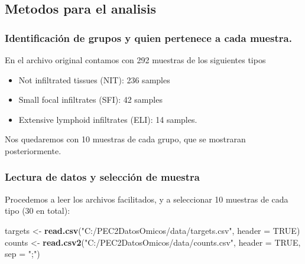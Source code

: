 \documentclass[
]{article}
\newenvironment{Shaded}{\begin{snugshade}}{\end{snugshade}}
\newcommand{\DataTypeTok}[1]{\textcolor[rgb]{0.13,0.29,0.53}{#1}}
\newcommand{\KeywordTok}[1]{\textcolor[rgb]{0.13,0.29,0.53}{\textbf{#1}}}
\newcommand{\NormalTok}[1]{#1}
\newcommand{\OtherTok}[1]{\textcolor[rgb]{0.56,0.35,0.01}{#1}}
\newcommand{\StringTok}[1]{\textcolor[rgb]{0.31,0.60,0.02}{#1}}
\providecommand{\tightlist}{%
  \setlength{\itemsep}{0pt}\setlength{\parskip}{0pt}}
\begin{document}
\hypertarget{metodos-para-el-analisis}{%
\subsection{Metodos para el analisis}\label{metodos-para-el-analisis}}

\hypertarget{identificaciuxf3n-de-grupos-y-quien-pertenece-a-cada-muestra.}{%
\subsubsection{Identificación de grupos y quien pertenece a cada
muestra.}\label{identificaciuxf3n-de-grupos-y-quien-pertenece-a-cada-muestra.}}

En el archivo original contamos con 292 muestras de los siguientes tipos

\begin{itemize}
\tightlist
\item
  Not infiltrated tissues (NIT): 236 samples
\item
  Small focal infiltrates (SFI): 42 samples
\item
  Extensive lymphoid infiltrates (ELI): 14 samples.
\end{itemize}

Nos quedaremos con 10 muestras de cada grupo, que se mostraran
posteriormente.

\hypertarget{lectura-de-datos-y-selecciuxf3n-de-muestra}{%
\subsubsection{Lectura de datos y selección de
muestra}\label{lectura-de-datos-y-selecciuxf3n-de-muestra}}

Procedemos a leer los archivos facilitados, y a seleccionar 10 muestras
de cada tipo (30 en total):

\begin{Shaded}
\begin{Highlighting}[]
\NormalTok{targets <-}\StringTok{  }\KeywordTok{read.csv}\NormalTok{(}\StringTok{"C:/PEC2DatosOmicos/data/targets.csv"}\NormalTok{, }\DataTypeTok{header =} \OtherTok{TRUE}\NormalTok{)}
\NormalTok{counts <-}\StringTok{  }\KeywordTok{read.csv2}\NormalTok{(}\StringTok{"C:/PEC2DatosOmicos/data/counts.csv"}\NormalTok{, }\DataTypeTok{header =} \OtherTok{TRUE}\NormalTok{, }\DataTypeTok{sep =} \StringTok{";"}\NormalTok{)}
\end{Highlighting}
\end{Shaded}
\end{document}
